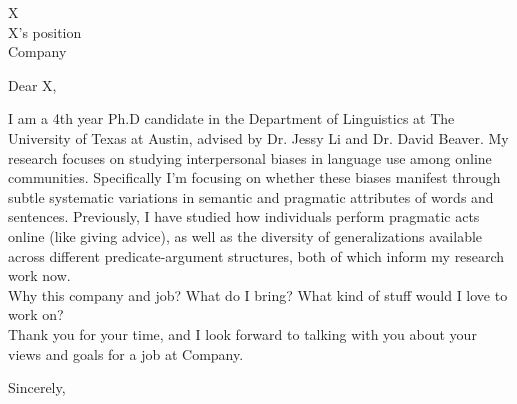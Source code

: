 \documentclass[myletter, a4paper, 11pt]{scrlttr2}
\begin{document}
\begin{letter}{
    X\\
    X's position\\
    Company
}


\opening{Dear X,}

I am a 4th year Ph.D candidate in the Department of Linguistics at The University of Texas at Austin, advised by Dr. Jessy Li and Dr. David Beaver. My research focuses on studying interpersonal biases in language use among online communities. Specifically I'm focusing on whether these biases manifest through subtle systematic variations in semantic and pragmatic attributes of words and sentences. Previously, I have studied how individuals perform pragmatic acts online (like giving advice), as well as the diversity of generalizations available across different predicate-argument structures, both of which inform my research work now.\\

Why this company and job? What do I bring? What kind of stuff would I love to work on?\\

Thank you for your time, and I look forward to talking with you about your views and goals for a job at Company.

\closing{Sincerely,}


\end{letter}
\end{document}
